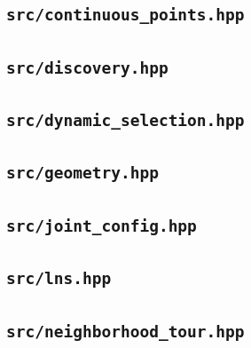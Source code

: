 \subsection*{\texttt{src/continuous\_points.hpp}}

\subsection*{\texttt{src/discovery.hpp}}

\subsection*{\texttt{src/dynamic\_selection.hpp}}

\subsection*{\texttt{src/geometry.hpp}}

\subsection*{\texttt{src/joint\_config.hpp}}

\subsection*{\texttt{src/lns.hpp}}

\subsection*{\texttt{src/neighborhood\_tour.hpp}}

